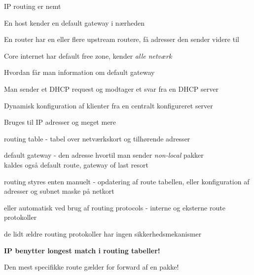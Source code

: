 

\begin{list1}
\item IP routing er nemt
\item En host kender en default gateway i nærheden
\item En router har en eller flere upstream routere, få adresser den sender videre til
\item Core internet har default free zone, kender \emph{alle netværk} 
\end{list1}





\begin{list1}
\item Hvordan får man information om default gateway
\item Man sender et DHCP request og modtager et svar fra en DHCP server
\item Dynamisk konfiguration af klienter fra en centralt konfigureret server
\item Bruges til IP adresser og meget mere
\end{list1}




\begin{list1}
  \item routing table - tabel over netværkskort og tilhørende adresser
\item default gateway - den adresse hvortil man sender
  \emph{non-local} pakker\\kaldes også default route, gateway of last
  resort
\item routing styres enten manuelt - opdatering af route tabellen,
  eller konfiguration af adresser og subnet maske på netkort
\item eller automatisk ved brug af routing protocols - interne og
  eksterne route protokoller
\item de lidt ældre routing protokoller har ingen sikkerhedsmekanismer
\item {\bf IP benytter longest match i routing tabeller!}
\item Den mest specifikke route gælder for forward af en pakke!
\end{list1}



